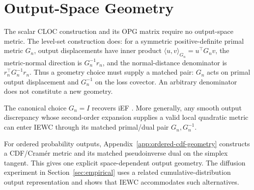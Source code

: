 \section{Output-Space Geometry}
\label{sec:output-geometry}

The scalar CLOC construction and its OPG matrix require no output-space metric. The level-set construction does: for a symmetric positive-definite primal metric $G_n$, output displacements have inner product $\langle u,v\rangle_{G_n}=u^\top G_n v$, the metric-normal direction is $G_n^{-1}r_n$, and the normal-distance denominator is $r_n^\top G_n^{-1}r_n$. Thus a geometry choice must supply a matched pair: $G_n$ acts on primal output displacement and $G_n^{-1}$ on the loss covector. An arbitrary denominator does not constitute a new geometry.

The canonical choice $G_n=I$ recovers iEF \citep{IEF}. More generally, any smooth output discrepancy whose second-order expansion supplies a valid local quadratic metric can enter IEWC through its matched primal/dual pair $G_n,G_n^{-1}$.

For ordered probability outputs, Appendix~\ref{app:ordered-cdf-geometry} constructs a CDF/Cram\'er metric and its matched pseudoinverse dual on the simplex tangent. This gives one explicit space-dependent output geometry. The diffusion experiment in Section~\ref{sec:empirical} uses a related cumulative-distribution output representation and shows that IEWC accommodates such alternatives.
